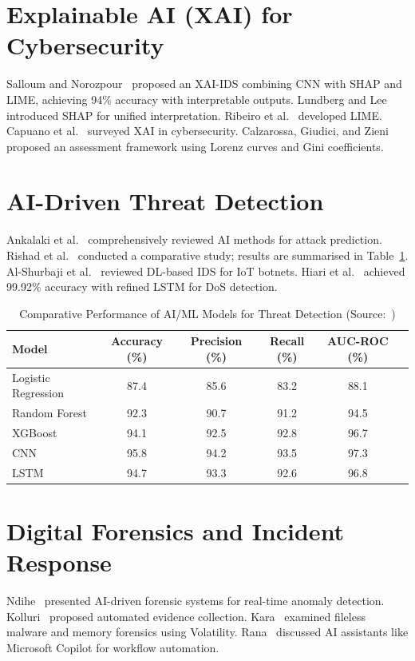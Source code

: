 \documentclass[12pt,a4paper]{report}
\newcommand{\hcell}[1]{\cellcolor{tableheader}\color{white}\textbf{#1}}
\begin{document}
\section{Explainable AI (XAI) for Cybersecurity}
Salloum and Norozpour~\cite{salloum2025} proposed an XAI-IDS combining CNN with SHAP and LIME, achieving 94\% accuracy with interpretable outputs. Lundberg and Lee~\cite{lundberg2017} introduced SHAP for unified interpretation. Ribeiro et al.~\cite{ribeiro2016} developed LIME. Capuano et al.~\cite{capuano2022} surveyed XAI in cybersecurity. Calzarossa, Giudici, and Zieni~\cite{calzarossa2025} proposed an assessment framework using Lorenz curves and Gini coefficients.

\section{AI-Driven Threat Detection}
Ankalaki et al.~\cite{ankalaki2025} comprehensively reviewed AI methods for attack prediction. Rishad et al.~\cite{rishad2025} conducted a comparative study; results are summarised in Table~\ref{tab:model_comparison}. Al-Shurbaji et al.~\cite{alshurbaji2025} reviewed DL-based IDS for IoT botnets. Hiari et al.~\cite{hiari2025} achieved 99.92\% accuracy with refined LSTM for DoS detection.

\begin{table}[H]
\centering
\caption{Comparative Performance of AI/ML Models for Threat Detection (Source:~\cite{rishad2025})}
\small
\begin{tabular}{@{}lccccc@{}}
\toprule
\hcell{Model} & \hcell{Accuracy (\%)} & \hcell{Precision (\%)} & \hcell{Recall (\%)} & \hcell{AUC-ROC (\%)} \\
\midrule
Logistic Regression & 87.4 & 85.6 & 83.2 & 88.1 \\
Random Forest & 92.3 & 90.7 & 91.2 & 94.5 \\
XGBoost & 94.1 & 92.5 & 92.8 & 96.7 \\
CNN & 95.8 & 94.2 & 93.5 & 97.3 \\
LSTM & 94.7 & 93.3 & 92.6 & 96.8 \\
\bottomrule
\end{tabular}
\label{tab:model_comparison}
\end{table}

\section{Digital Forensics and Incident Response}
Ndihe~\cite{ndihe2024} presented AI-driven forensic systems for real-time anomaly detection. Kolluri~\cite{kolluri2016} proposed automated evidence collection. Kara~\cite{kara2023} examined fileless malware and memory forensics using Volatility. Rana~\cite{rana2025} discussed AI assistants like Microsoft Copilot for workflow automation.
\end{document}
